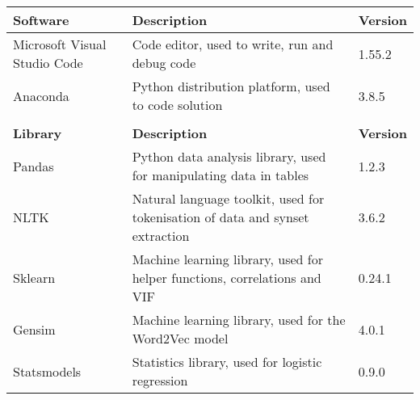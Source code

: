 \begin{tabular}{|p{30mm}|p{70mm}|l|} \hline
\textbf{Software} & \textbf{Description} & \textbf{Version} \\ \hline
Microsoft Visual Studio Code & Code editor, used to write, run and debug code & 1.55.2 \\ \hline
Anaconda & Python distribution platform, used to code solution & 3.8.5 \\ \hline
\multicolumn{3}{c}{} \\ \hline
\textbf{Library} & \textbf{Description} & \textbf{Version} \\ \hline
Pandas & Python data analysis library, used for manipulating data in tables & 1.2.3 \\ \hline
NLTK & Natural language toolkit, used for tokenisation of data and synset extraction & 3.6.2 \\ \hline
Sklearn & Machine learning library, used for helper functions, correlations and VIF & 0.24.1 \\ \hline
Gensim & Machine learning library, used for the Word2Vec model & 4.0.1 \\ \hline
Statsmodels & Statistics library, used for logistic regression & 0.9.0 \\ \hline
\end{tabular}